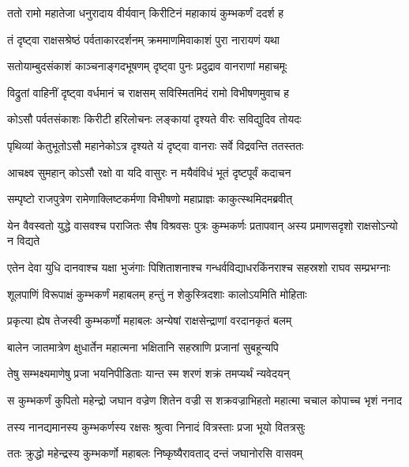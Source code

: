 
\twolineshloka
{ततो रामो महातेजा धनुरादाय वीर्यवान्}
{किरीटिनं महाकायं कुम्भकर्णं ददर्श ह} %

\twolineshloka
{तं दृष्ट्वा राक्षसश्रेष्ठं पर्वताकारदर्शनम्}
{क्रममाणमिवाकाशं पुरा नारायणं यथा} %

\twolineshloka
{सतोयाम्बुदसंकाशं काञ्चनाङ्गदभूषणम्}
{दृष्ट्वा पुनः प्रदुद्राव वानराणां महाचमूः} %

\twolineshloka
{विद्रुतां वाहिनीं दृष्ट्वा वर्धमानं च राक्षसम्}
{सविस्मितमिदं रामो विभीषणमुवाच ह} %

\twolineshloka
{कोऽसौ पर्वतसंकाशः किरीटी हरिलोचनः}
{लङ्कायां दृश्यते वीरः सविद्युदिव तोयदः} %

\twolineshloka
{पृथिव्यां केतुभूतोऽसौ महानेकोऽत्र दृश्यते}
{यं दृष्ट्वा वानराः सर्वे विद्रवन्ति ततस्ततः} %

\twolineshloka
{आचक्ष्व सुमहान् कोऽसौ रक्षो वा यदि वासुरः}
{न मयैवंविधं भूतं दृष्टपूर्वं कदाचन} %

\twolineshloka
{सम्पृष्टो राजपुत्रेण रामेणाक्लिष्टकर्मणा}
{विभीषणो महाप्राज्ञः काकुत्स्थमिदमब्रवीत्} %

\threelineshloka
{येन वैवस्वतो युद्धे वासवश्च पराजितः}
{सैष विश्रवसः पुत्रः कुम्भकर्णः प्रतापवान्}
{अस्य प्रमाणसदृशो राक्षसोऽन्यो न विद्यते} %

\twolineshloka
{एतेन देवा युधि दानवाश्च यक्षा भुजंगाः पिशिताशनाश्च}
{गन्धर्वविद्याधरकिंनराश्च सहस्रशो राघव सम्प्रभग्नाः} %

\twolineshloka
{शूलपाणिं विरूपाक्षं कुम्भकर्णं महाबलम्}
{हन्तुं न शेकुस्त्रिदशाः कालोऽयमिति मोहिताः} %

\twolineshloka
{प्रकृत्या ह्येष तेजस्वी कुम्भकर्णो महाबलः}
{अन्येषां राक्षसेन्द्राणां वरदानकृतं बलम्} %

\twolineshloka
{बालेन जातमात्रेण क्षुधार्तेन महात्मना}
{भक्षितानि सहस्राणि प्रजानां सुबहून्यपि} %

\twolineshloka
{तेषु सम्भक्ष्यमाणेषु प्रजा भयनिपीडिताः}
{यान्त स्म शरणं शक्रं तमप्यर्थं न्यवेदयन्} %

\twolineshloka
{स कुम्भकर्णं कुपितो महेन्द्रो जघान वज्रेण शितेन वज्री}
{स शक्रवज्राभिहतो महात्मा चचाल कोपाच्च भृशं ननाद} %

\twolineshloka
{तस्य नानद्यमानस्य कुम्भकर्णस्य रक्षसः}
{श्रुत्वा निनादं वित्रस्ताः प्रजा भूयो वितत्रसुः} %

\twolineshloka
{ततः क्रुद्धो महेन्द्रस्य कुम्भकर्णो महाबलः}
{निष्कृष्यैरावताद् दन्तं जघानोरसि वासवम्} %

